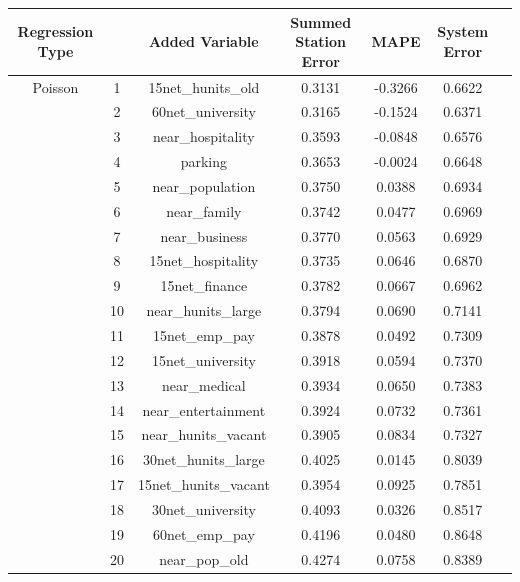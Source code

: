 \documentclass{article}
\begin{document}
\begin{center}
\begin{tabular}{ c c c c c c c }
\hline
Regression Type&&Added Variable&Summed Station Error&MAPE&System Error \\
\hline
Poisson&1&15net\_hunits\_old&0.3131&-0.3266&0.6622\\
&2&60net\_university&0.3165&-0.1524&0.6371\\
&3&near\_hospitality&0.3593&-0.0848&0.6576\\
&4&parking&0.3653&-0.0024&0.6648\\
&5&near\_population&0.3750&0.0388&0.6934\\
&6&near\_family&0.3742&0.0477&0.6969\\
&7&near\_business&0.3770&0.0563&0.6929\\
&8&15net\_hospitality&0.3735&0.0646&0.6870\\
&9&15net\_finance&0.3782&0.0667&0.6962\\
&10&near\_hunits\_large&0.3794&0.0690&0.7141\\
&11&15net\_emp\_pay&0.3878&0.0492&0.7309\\
&12&15net\_university&0.3918&0.0594&0.7370\\
&13&near\_medical&0.3934&0.0650&0.7383\\
&14&near\_entertainment&0.3924&0.0732&0.7361\\
&15&near\_hunits\_vacant&0.3905&0.0834&0.7327\\
&16&30net\_hunits\_large&0.4025&0.0145&0.8039\\
&17&15net\_hunits\_vacant&0.3954&0.0925&0.7851\\
&18&30net\_university&0.4093&0.0326&0.8517\\
&19&60net\_emp\_pay&0.4196&0.0480&0.8648\\
&20&near\_pop\_old&0.4274&0.0758&0.8389\\
\end{tabular}
\end{center}
\end{document}
